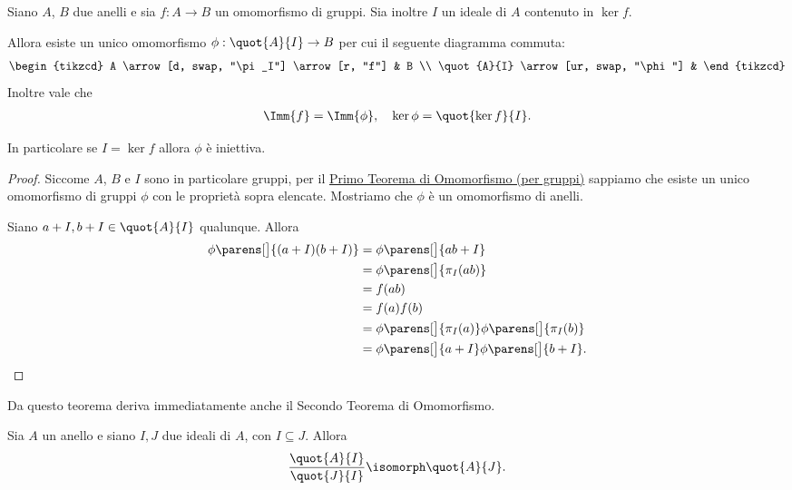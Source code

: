 \begin{theorem}
     \label{th:first_iso}
    Siano $A$, $B$ due anelli e sia $f : A \to B$ un omomorfismo di gruppi. Sia inoltre $I$ un ideale di $A$ contenuto in $\ker f$.

    Allora esiste un unico omomorfismo $\phi : \quot{A}{I} \to B$ per cui il seguente diagramma commuta:
    \begin{equation}
        \begin{tikzcd}
            A \arrow[d, swap, "\pi_I"] \arrow[r, "f"] & B \\
            \quot{A}{I} \arrow[ur, swap, "\phi"] &
        \end{tikzcd}
    \end{equation}
    Inoltre vale che \begin{align*}
        \Imm{f} = \Imm{\phi}, \quad \ker \phi = \quot{\ker f}{I}.
    \end{align*}

    In particolare se $I = \ker f$ allora $\phi$ è iniettiva.
\end{theorem}
\begin{proof}
    Siccome $A$, $B$ e $I$ sono in particolare gruppi, per il \hyperref[th:first_iso]{Primo Teorema di Omomorfismo (per gruppi)} sappiamo che esiste un unico omomorfismo di gruppi $\phi$ con le proprietà sopra elencate. Mostriamo che $\phi$ è un omomorfismo di anelli.

    Siano $a + I, b + I \in \quot{A}{I}$ qualunque. Allora \begin{align*}
        \phi\parens[\big]{(a+I)(b +I)} &= \phi\parens[\big]{ab + I}\\
        &= \phi\parens[\big]{\pi_I(ab)}\\
        &= f(ab)\\
        &= f(a)f(b)\\
        &= \phi\parens[\big]{\pi_I(a)}\phi\parens[\big]{\pi_I(b)}\\
        &= \phi\parens[\big]{a+I}\phi\parens[\big]{b+I}. \qedhere
    \end{align*}
\end{proof}

Da questo teorema deriva immediatamente anche il Secondo Teorema di Omomorfismo.
\begin{theorem}
     \label{th:second_iso_rings}
    Sia $A$ un anello e siano $I, J$ due ideali di $A$, con $I \subseteq J$. Allora \begin{equation}
        \frac{\quot{A}{I}}{\quot{J}{I}} \isomorph \quot{A}{J}.
    \end{equation}
\end{theorem}

